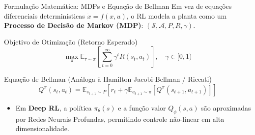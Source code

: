 \documentclass[11pt, aspectratio=169]{beamer}
\begin{document}
\begin{frame}{Formulação Matemática: MDPs e Equação de Bellman}
    Em vez de equações diferenciais determinísticas $\dot{x} = f(x,u)$, o RL modela a planta como um \textbf{Processo de Decisão de Markov (MDP)}: $(\mathcal{S}, \mathcal{A}, P, R, \gamma)$.
    
    \begin{block}{Objetivo de Otimização (Retorno Esperado)}
        \[ \max_{\pi} \mathbb{E}_{\tau \sim \pi} \left[ \sum_{t=0}^{\infty} \gamma^t R(s_t, a_t) \right], \quad \gamma \in [0, 1) \]
    \end{block}
    
    \begin{alertblock}{Equação de Bellman (Análoga à Hamilton-Jacobi-Bellman / Riccati)}
        \[ Q^{\pi}(s_t, a_t) = \mathbb{E}_{s_{t+1} \sim P} \left[ r_t + \gamma \mathbb{E}_{a_{t+1} \sim \pi} \left[ Q^{\pi}(s_{t+1}, a_{t+1}) \right] \right] \]
    \end{alertblock}
    
    \begin{itemize}
        \item Em \textbf{Deep RL}, a política $\pi_\theta(s)$ e a função valor $Q_\phi(s,a)$ são aproximadas por Redes Neurais Profundas, permitindo controle não-linear em alta dimensionalidade.
    \end{itemize}
\end{frame}
\end{document}
